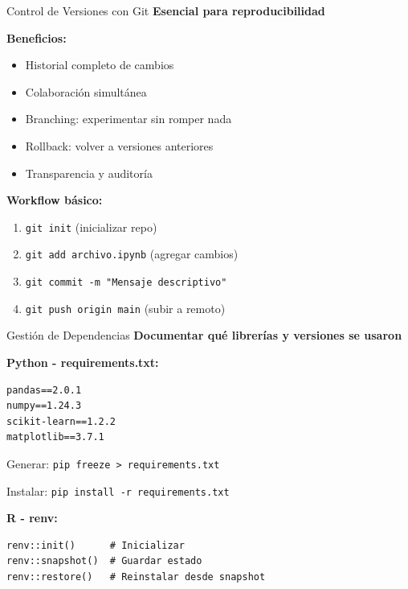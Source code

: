 \documentclass[aspectratio=169]{beamer}
\begin{document}
\begin{frame}{Control de Versiones con Git}
\textbf{Esencial para reproducibilidad}

\vspace{0.3cm}

\textbf{Beneficios:}
\begin{itemize}
\item Historial completo de cambios
\item Colaboración simultánea
\item Branching: experimentar sin romper nada
\item Rollback: volver a versiones anteriores
\item Transparencia y auditoría
\end{itemize}

\vspace{0.3cm}

\textbf{Workflow básico:}
\begin{enumerate}
\item \texttt{git init} (inicializar repo)
\item \texttt{git add archivo.ipynb} (agregar cambios)
\item \texttt{git commit -m "Mensaje descriptivo"}
\item \texttt{git push origin main} (subir a remoto)
\end{enumerate}
\end{frame}

\begin{frame}[fragile]{Gestión de Dependencias}
\textbf{Documentar qué librerías y versiones se usaron}

\vspace{0.3cm}

\textbf{Python - requirements.txt:}
\begin{verbatim}
pandas==2.0.1
numpy==1.24.3
scikit-learn==1.2.2
matplotlib==3.7.1
\end{verbatim}

Generar: \texttt{pip freeze > requirements.txt}

Instalar: \texttt{pip install -r requirements.txt}

\vspace{0.3cm}

\textbf{R - renv:}
\begin{verbatim}
renv::init()      # Inicializar
renv::snapshot()  # Guardar estado
renv::restore()   # Reinstalar desde snapshot
\end{verbatim}
\end{frame}
\end{document}
